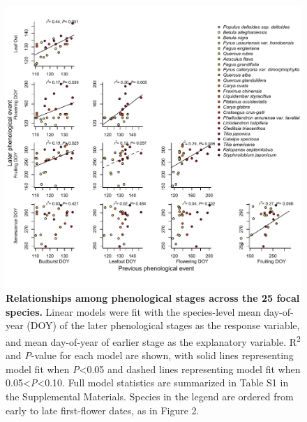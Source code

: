 \documentclass{article}
\begin{document}
  \begin{figure}[h]
  \centering
  \includegraphics{../analyses/figures/latevearly_rp_col_legend_ROY_ripefruit.pdf}
  
  \caption{\textbf{Relationships among phenological stages across the 25 focal species.} Linear models were fit with the species-level mean day-of-year (DOY) of the later phenological stages as the response variable, and mean day-of-year of earlier stage as the explanatory variable. R\textsuperscript{2} and \textit{P}-value for each model are shown, with solid lines representing model fit when \textit{P}<0.05 and dashed lines representing model fit when 0.05<\textit{P}<0.10. Full model statistics are summarized in Table S1 in the Supplemental Materials. Species in the legend are ordered from early to late first-flower dates, as in Figure 2.} %
  \label{fig:latevearly}
\end{figure}
\end{document}
